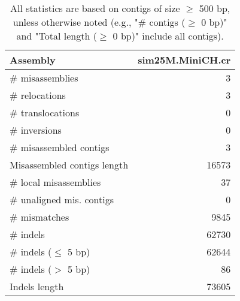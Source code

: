 \documentclass[12pt,a4paper]{article}
\begin{document}
\begin{table}[ht]
\begin{center}
\caption{All statistics are based on contigs of size $\geq$ 500 bp, unless otherwise noted (e.g., "\# contigs ($\geq$ 0 bp)" and "Total length ($\geq$ 0 bp)" include all contigs).}
\begin{tabular}{|l*{1}{|r}|}
\hline
Assembly & sim25M.MiniCH.cr \\ \hline
\# misassemblies & 3 \\ \hline
\hspace{5mm}\# relocations & 3 \\ \hline
\hspace{5mm}\# translocations & 0 \\ \hline
\hspace{5mm}\# inversions & 0 \\ \hline
\# misassembled contigs & 3 \\ \hline
Misassembled contigs length & 16573 \\ \hline
\# local misassemblies & 37 \\ \hline
\# unaligned mis. contigs & 0 \\ \hline
\# mismatches & 9845 \\ \hline
\# indels & 62730 \\ \hline
\hspace{5mm}\# indels ($\leq$ 5 bp) & 62644 \\ \hline
\hspace{5mm}\# indels ($>$ 5 bp) & 86 \\ \hline
Indels length & 73605 \\ \hline
\end{tabular}
\end{center}
\end{table}
\end{document}
